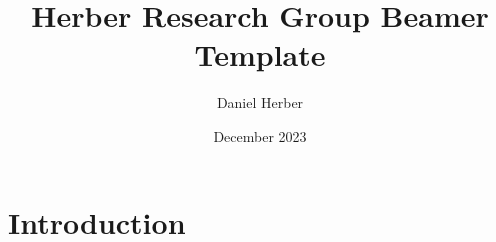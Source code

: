 \documentclass{article}
\title{Herber Research Group Beamer Template}
\author{Daniel Herber}
\date{December 2023}
\begin{document}
\maketitle

\section{Introduction}
\end{document}
